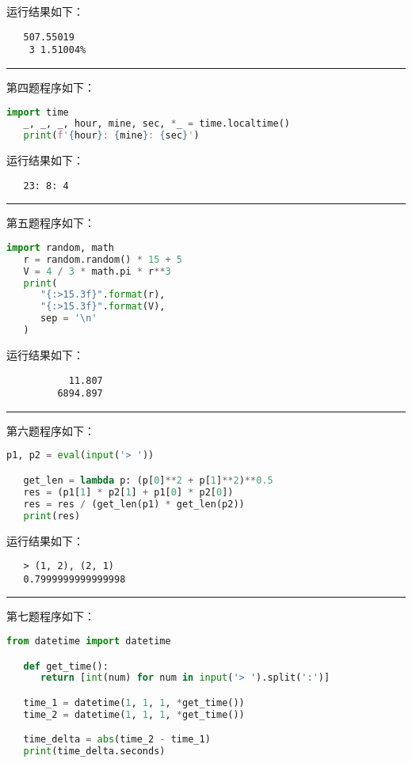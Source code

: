 \documentclass[a4paper]{ctexart}
\newcommand{\lineiin}{
   \begin{center}
      \rule{\textwidth}{0.1pt}
   \end{center}
}
\begin{document}
      运行结果如下：
      \begin{lstlisting}
   507.55019
    3 1.51004%
      \end{lstlisting}

      \lineiin

      第四题程序如下：
      \begin{lstlisting}[language=python]
   import time
   _, _, _, hour, mine, sec, *_ = time.localtime()
   print(f'{hour}: {mine}: {sec}')
      \end{lstlisting}

      运行结果如下：
      \begin{lstlisting}
   23: 8: 4
      \end{lstlisting}

      \lineiin

      第五题程序如下：
      \begin{lstlisting}[language=python]
   import random, math
   r = random.random() * 15 + 5
   V = 4 / 3 * math.pi * r**3
   print(
      "{:>15.3f}".format(r),
      "{:>15.3f}".format(V),
      sep = '\n'
   )
      \end{lstlisting}

      运行结果如下：
      \begin{lstlisting}
           11.807
         6894.897   
      \end{lstlisting}

      \lineiin

      第六题程序如下：
      \begin{lstlisting}[language=python]
   p1, p2 = eval(input('> '))

   get_len = lambda p: (p[0]**2 + p[1]**2)**0.5
   res = (p1[1] * p2[1] + p1[0] * p2[0])
   res = res / (get_len(p1) * get_len(p2))
   print(res)
      \end{lstlisting}

      运行结果如下：
      \begin{lstlisting}
   > (1, 2), (2, 1)
   0.7999999999999998
      \end{lstlisting}

      \lineiin

      第七题程序如下：
      \begin{lstlisting}[language=python]
   from datetime import datetime

   def get_time():
      return [int(num) for num in input('> ').split(':')]

   time_1 = datetime(1, 1, 1, *get_time())
   time_2 = datetime(1, 1, 1, *get_time())

   time_delta = abs(time_2 - time_1)
   print(time_delta.seconds)
      \end{lstlisting}
\end{document}
